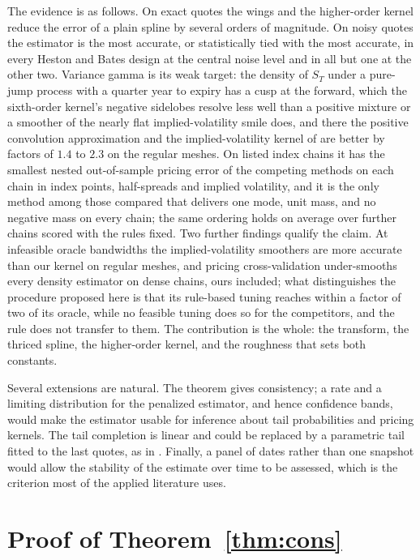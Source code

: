\documentclass[preprint,12pt,authoryear,times]{elsarticle}
\begin{document}
The evidence is as follows. On exact quotes the wings and the higher-order kernel reduce the error of a plain spline by several orders of magnitude. On noisy quotes the estimator is the most accurate, or statistically tied with the most accurate, in every Heston and Bates design at the central noise level and in all but one at the other two. Variance gamma is its weak target: the density of \(S_T\) under a pure-jump process with a quarter year to expiry has a cusp at the forward, which the sixth-order kernel's negative sidelobes resolve less well than a positive mixture or a smoother of the nearly flat implied-volatility smile does, and there the positive convolution approximation and the implied-volatility kernel of \citeauthor{aitsahalia1998} are better by factors of \(1.4\) to \(2.3\) on the regular meshes. On listed index chains it has the smallest nested out-of-sample pricing error of the competing methods on each chain in index points, half-spreads and implied volatility, and it is the only method among those compared that delivers one mode, unit mass, and no negative mass on every chain; the same ordering holds on average over \nextra{} further chains scored with the rules fixed. Two further findings qualify the claim. At infeasible oracle bandwidths the implied-volatility smoothers are more accurate than our kernel on regular meshes, and pricing cross-validation under-smooths every density estimator on dense chains, ours included; what distinguishes the procedure proposed here is that its rule-based tuning reaches within a factor of two of its oracle, while no feasible tuning does so for the competitors, and the rule does not transfer to them. The contribution is the whole: the transform, the thriced spline, the higher-order kernel, and the roughness that sets both constants.

Several extensions are natural. The theorem gives consistency; a rate and a limiting distribution for the penalized estimator, and hence confidence bands, would make the estimator usable for inference about tail probabilities and pricing kernels. The tail completion is linear and could be replaced by a parametric tail fitted to the last quotes, as in \citet{figlewski2010}. Finally, a panel of dates rather than one snapshot would allow the stability of the estimate over time to be assessed, which is the criterion most of the applied literature uses.

\appendix

\section{Proof of Theorem~\ref{thm:cons}}
\label{app:proof}
\end{document}
